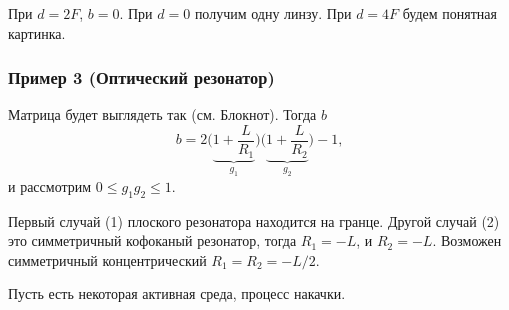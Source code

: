 При $d=2F$, $b=0$. При $d=0$ получим одну линзу. При $d=4F$ будем понятная картинка. 



\subsubsection*{Пример 3 (Оптический резонатор)}

Матрица будет выглядеть так (см. Блокнот). Тогда $b$ 
\begin{equation*}
    b = 2 \bigg(\underbrace{1+\frac{L}{R_1}}_{g_1}\bigg)\bigg(\underbrace{1+\frac{L}{R_2}}_{g_2}\bigg) - 1,
\end{equation*}
и рассмотрим $0 \leq g_1 g_2 \leq 1$.


Первый случай (1) плоского резонатора находится на гранце. Другой случай (2) это симметричный кофоканый резонатор, тогда $R_1 = -L$, и $R_2 = - L$.  Возможен симметричный концентрический $R_1 = R_2 = -L/2$. 


Пусть есть некоторая активная среда, процесс накачки. 

